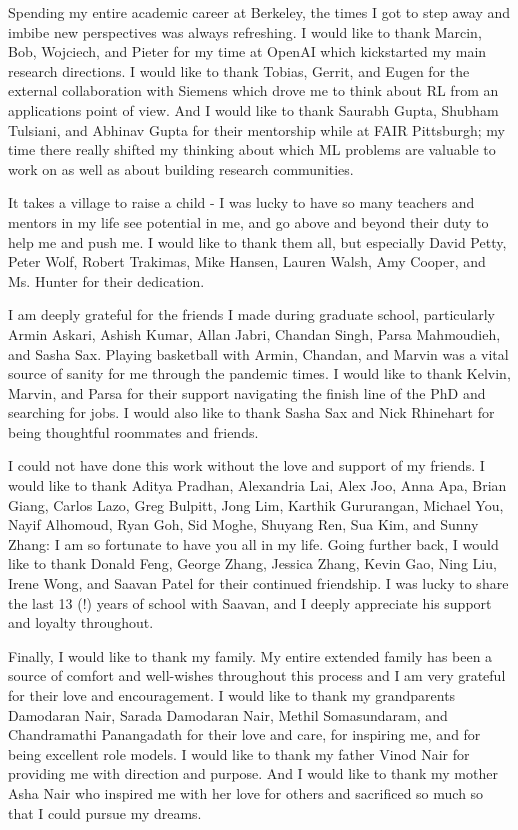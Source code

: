 Spending my entire academic career at Berkeley, the times I got to step away and imbibe new perspectives was always refreshing.
I would like to thank Marcin, Bob, Wojciech, and Pieter for my time at OpenAI which kickstarted my main research directions.
I would like to thank Tobias, Gerrit, and Eugen for the external collaboration with Siemens which drove me to think about RL from an applications point of view.
And I would like to thank Saurabh Gupta, Shubham Tulsiani, and Abhinav Gupta for their mentorship while at FAIR Pittsburgh; my time there really shifted my thinking about which ML problems are valuable to work on as well as about building research communities.

It takes a village to raise a child - I was lucky to have so many teachers and mentors in my life see potential in me, and go above and beyond their duty to help me and push me. I would like to thank them all, but especially David Petty, Peter Wolf, Robert Trakimas, Mike Hansen, Lauren Walsh, Amy Cooper, and Ms. Hunter for their dedication.

I am deeply grateful for the friends I made during graduate school, particularly Armin Askari, Ashish Kumar, Allan Jabri, Chandan Singh, Parsa Mahmoudieh, and Sasha Sax.
Playing basketball with Armin, Chandan, and Marvin was a vital source of sanity for me through the pandemic times.
I would like to thank Kelvin, Marvin, and Parsa for their support navigating the finish line of the PhD and searching for jobs.
I would also like to thank Sasha Sax and Nick Rhinehart for being thoughtful roommates and friends.

\vspace{5mm}

I could not have done this work without the love and support of my friends.
I would like to thank Aditya Pradhan, Alexandria Lai, Alex Joo, Anna Apa, Brian Giang, Carlos Lazo, Greg Bulpitt, Jong Lim, Karthik Gururangan, Michael You, Nayif Alhomoud, Ryan Goh, Sid Moghe, Shuyang Ren, Sua Kim, and Sunny Zhang: I am so fortunate to have you all in my life.
Going further back, I would like to thank Donald Feng, George Zhang, Jessica Zhang, Kevin Gao, Ning Liu, Irene Wong, and Saavan Patel for their continued friendship.
I was lucky to share the last 13 (!) years of school with Saavan, and I deeply appreciate his support and loyalty throughout.

Finally, I would like to thank my family.
My entire extended family has been a source of comfort and well-wishes throughout this process and I am very grateful for their love and encouragement.
I would like to thank my grandparents Damodaran Nair, Sarada Damodaran Nair, Methil Somasundaram, and Chandramathi Panangadath for their love and care, for inspiring me, and for being excellent role models.
I would like to thank my father Vinod Nair for providing me with direction and purpose.
And I would like to thank my mother Asha Nair who inspired me with her love for others and sacrificed so much so that I could pursue my dreams.
